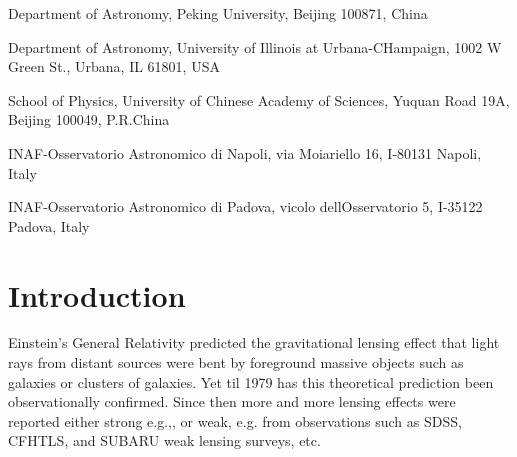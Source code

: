 \documentclass[apj]{emulateapj}
\begin{document}
 {Department of Astronomy, Peking University, Beijing
  100871, China}

 {Department of Astronomy, University of Illinois at
  Urbana-CHampaign, 1002 W Green St., Urbana, IL 61801, USA}

 {School of Physics, University of Chinese Academy of Sciences,
  Yuquan Road 19A, Beijing 100049, P.R.China}

 {INAF-Osservatorio Astronomico di Napoli, via Moiariello 16,
  I-80131 Napoli, Italy}

 {INAF-Osservatorio Astronomico di Padova, vicolo
  dellOsservatorio 5, I-35122 Padova, Italy}


\begin{abstract}
  As the first paper in a series on studying the galaxy-galaxy lensing
  from Sloan Digital Sky Survey Data Release 7 (SDSS DR7), we present
  our image processing pipeline which mainly focuses on correcting the
  systematics introduced by Point Spread Function (PSF).  Using this
  pipeline, we processed SDSS DR7 imaging data in $r$ band and
  generated a background galaxy catalog containing the shape
  information of each galaxy.  To assess the quality of our image
  processing pipeline, we measured the galaxy-galaxy lensing signals
  around spectroscopic galaxy samples binned in luminosity and stellar
  mass. Our results are in good agreement with \citet{Mandelbaum2005,
    Mandelbaum2006} with significantly reduced error bars. The
  consistency between the two confirms the reliability of our image
  processing pipeline and initiates our subsequent galaxy-galaxy weak
  lensing studies.
\end{abstract}




\section{Introduction}
\label{sec_intro}

Einstein's General Relativity predicted the gravitational lensing
effect that light rays from distant sources were bent by foreground
massive objects such as galaxies or clusters of galaxies. Yet til
1979 \citep{Walsh1979} has this theoretical prediction been
observationally confirmed. Since then more and more lensing effects
were reported either strong e.g.,\citet{Oguri2002, Kneib2004}, or
weak, e.g. \citet{Sheldon2004, Mandelbaum2005, Mandelbaum2006, Fu2008,
  Bernstein2009,Cacciato2009, Oguri2009, George2012, Li2013,
  Mandelbaum2013, Li2014} from observations such as SDSS, CFHTLS, and
SUBARU weak lensing surveys, etc.
\end{document}
